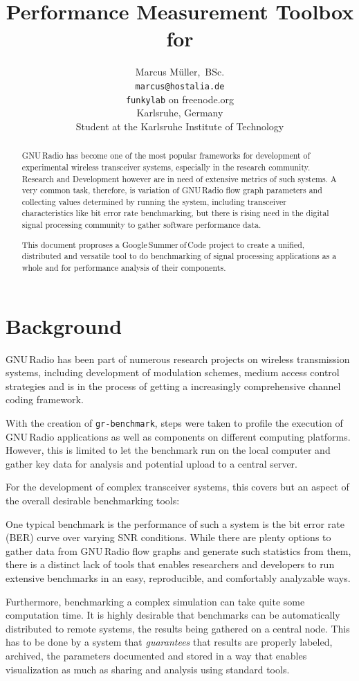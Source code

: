 \documentclass[a4paper]{IEEEtran}
\author{Marcus Müller,~BSc. \\[1.2em]%
{\scriptsize \texttt{marcus@hostalia.de}\\%
\texttt{funkylab} on freenode.org}\\[1.2em]%
%
{\footnotesize Karlsruhe, Germany\\Student at the Karlsruhe Institute of Technology}}
\title{Performance Measurement Toolbox for \gr}
\newcommand{\gr}{GNU\,Radio\xspace}
\newcommand{\gsoc}{Google\,Summer\,of\,Code\xspace}
\newcommand{\grbench}{\texttt{gr-benchmark}\xspace}
\begin{document}
\maketitle

\begin{abstract}
\gr has become one of the most popular frameworks for development of
experimental wireless transceiver systems, especially in the research
community. Research and Development however are in need of extensive metrics of
such systems. A very common task, therefore, is variation of \gr flow graph
parameters and collecting values determined by running the system, including
transceiver characteristics like bit error rate benchmarking, but there is
rising need in the digital signal processing community to gather software
performance data.

This document proproses a \gsoc project to create a unified, distributed and
versatile tool to do benchmarking of signal processing applications as a whole
and for performance analysis of their components.
\end{abstract}

\section{Background}
\gr has been part of numerous research projects on wireless transmission
systems, including development of modulation schemes, medium access control
strategies and is in the process of getting a increasingly comprehensive
channel coding framework\cite{grfec}.

With the creation of \grbench, steps were taken to profile the
execution of \gr applications as well as components on different computing
platforms. However, this is limited to let the benchmark run on the local
computer and gather key data for analysis and potential upload to a central
server\cite{grbenchmark}.

For the development of complex transceiver systems, this covers but an aspect
of the overall desirable benchmarking tools:

One typical benchmark is the performance of such a system is the bit error rate (BER) 
curve over varying SNR conditions. While there are plenty options to gather data from 
\gr flow graphs and generate such statistics from them, there is a distinct lack of tools
that enables researchers and developers to run extensive benchmarks in an easy, reproducible,
and comfortably analyzable ways. 

Furthermore, benchmarking a complex simulation can take quite some computation
time. It is highly desirable that benchmarks can be automatically distributed to remote
systems, the results being gathered on a central node. This has to be done by a 
system that \emph{guarantees} that results are properly labeled, archived, the parameters 
documented and stored in a way that enables visualization as much as sharing and 
analysis using standard tools.
\end{document}
